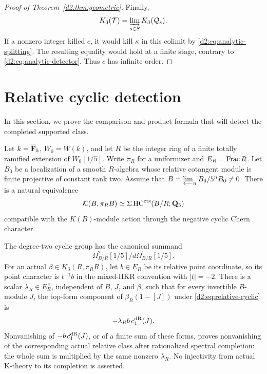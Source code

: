 \begin{proof}[Proof of Theorem~\ref{d2:thm:geometric}]
Finally,
\[
 K_3(\mathcal T)=\varinjlim_{s\in S}K_3(\mathcal Q_s).
\]
If a nonzero integer killed \(c\), it would kill \(\kappa\) in this
colimit by \eqref{d2:eq:analytic-splitting}.
The resulting equality would hold at a finite stage, contrary to
\eqref{d2:eq:analytic-detector}. Thus \(c\) has infinite order.
\end{proof}

\section{Relative cyclic detection}\label{d2:sec:cyclic}

In this section, we prove the comparison and product formula that will
detect the completed supported class.

\begin{proposition}\label{d2:prop:cyclic}
Let \(k=\overline{\mathbf{F}}_5\), \(W_0=W(k)\), and let \(R\) be the
integer ring of a finite totally ramified extension of \(W_0[1/5]\).
Write \(\pi_R\) for a uniformizer and \(E_R=\operatorname{Frac} R\).
Let \(B_0\) be a localization of a smooth \(R\)-algebra whose relative
cotangent module is finite projective of constant rank two.
Assume that \(B=\varprojlim_nB_0/5^nB_0\ne0\).
There is a natural equivalence
\begin{equation}\label{d2:eq:relative-cyclic}
 \mathcal K(B,\pi_RB)\simeq\Sigma\operatorname{HC}^{\mathrm{cts}}(B/R;\mathbf{Q}_5)
\end{equation}
compatible with the \(K(B)\)-module action through the negative cyclic
Chern character.

The degree-two cyclic group has the canonical summand
\[
 \Omega^2_{B/R}[1/5]\big/d\Omega^1_{B/R}[1/5].
\]
For an actual \(\beta\in K_3(R,\pi_RR)\), let \(b\in E_R\) be its
relative point coordinate, so its point character is \(t^{-1}b\)
in the mixed-HKR convention with \(|t|=-2\).
There is a scalar \(\lambda_R\in E_R^\times\), independent of
\(B\), \(J\), and \(\beta\), such that for every invertible
\(B\)-module \(J\), the top-form component of
\(\beta_B(1-[J])\) under \eqref{d2:eq:relative-cyclic} is
\[
 -\lambda_R b\,c_1^{\mathrm{dR}}(J).
\]
Nonvanishing of \(-b\,c_1^{\mathrm{dR}}(J)\), or of a finite sum of
these forms, proves nonvanishing of the corresponding actual
relative class after rationalized spectral completion: the whole
sum is multiplied by the same nonzero \(\lambda_R\).
No injectivity from actual K-theory to its completion is asserted.
\end{proposition}


